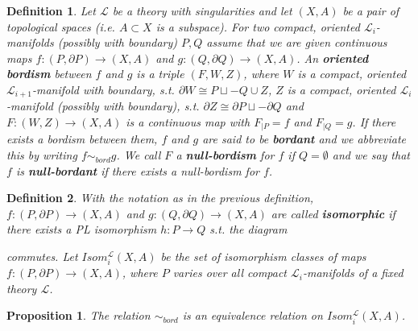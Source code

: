 \documentclass[11pt]{book}
\newtheorem{prop}{Proposition}
\newtheorem{definition}{Definition}
\begin{document}
\begin{definition}
Let $\mathcal{L}$ be a theory with singularities and let $(X,A)$ be a pair of topological spaces (i.e. $A \subset X$ is a subspace). For two compact, oriented $\mathcal{L}_i$-manifolds (possibly with boundary) $P,Q$  assume that we are given continuous maps $f:(P, \partial P) \to (X,A)$ and $g:(Q , \partial Q) \to (X,A)$. An \textbf{oriented bordism} between $f$ and $g$ is a triple $(F,W,Z)$, where $W$ is a compact, oriented $\mathcal{L}_{i+1}$-manifold with boundary, s.t. $\partial W \cong P \sqcup -Q \cup Z$, $Z$ is a compact, oriented $\mathcal{L}_i$-manifold (possibly with boundary), s.t. $\partial Z\cong \partial P \sqcup - \partial Q$ and $F: (W,Z) \to (X,A)$ is a continuous map with $F _{|P} = f$ and $F_{|Q}=g$. If there exists a bordism between them, $f$ and $g$ are said to be \textbf{bordant} and we abbreviate this by writing $f \sim_{bord} g$. We call $F$ a \textbf{null-bordism} for $f$ if $Q= \emptyset$ and we say that $f$ is \textbf{null-bordant} if there exists a null-bordism for $f$.
\end{definition}

\begin{definition}
With the notation as in the previous definition, $f: (P, \partial P) \to (X,A)$ and $g: (Q, \partial Q) \to (X,A)$ are called \textbf{isomorphic} if there exists a PL isomorphism $h : P \to Q$ s.t. the diagram \newline
\begin{xy}
\end{xy}
\newline
commutes. Let $Isom_{i}^{\mathcal{L}}(X,A)$ be the set of isomorphism classes of maps $f: (P, \partial P) \to (X,A)$, where $P$ varies over all compact $\mathcal{L}_i$-manifolds of a fixed theory $\mathcal{L}$.
\end{definition}

\begin{prop}
The relation $\sim_{bord} $ is an equivalence relation on $Isom_{i}^{\mathcal{L}}(X,A)$.
\end{prop}
\end{document}

